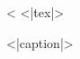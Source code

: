 \begin{figure}[h]
    \centering
    \label{<|name|>}
    <%
    <|tex|>
    \caption{<|caption|>}
\end{figure}
